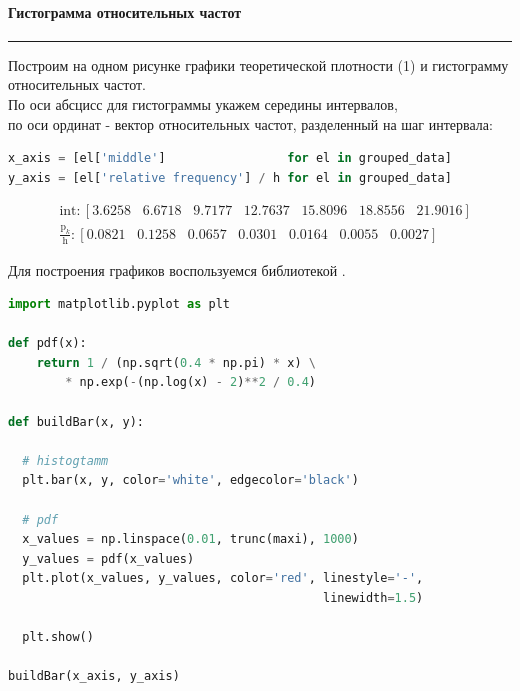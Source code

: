 \documentclass[a4paper, 14pt]{extarticle}
\begin{document}
\paragraph{Гистограмма относительных частот}\vspace{-20pt}\rule{\linewidth}{0.1mm}

Построим на одном рисунке графики теоретической плотности (1) и гистограмму относительных
частот. \\
По оси абсцисс для гистограммы укажем середины интервалов, \\
по оси ординат - вектор относительных частот, разделенный на шаг интервала: \\

\begin{lstlisting}[language=Python]
x_axis = [el['middle']                 for el in grouped_data]
y_axis = [el['relative frequency'] / h for el in grouped_data]
\end{lstlisting}

\begin{align*}
  & \text{int}: [ 3.6258 \hspace{10pt} 6.6718  \hspace{10pt} 9.7177 \hspace{10pt} 12.7637 \hspace{10pt} 15.8096 \hspace{10pt} 18.8556 \hspace{10pt} 21.9016] \\
  & \frac{\text{p}_k}{\text{h}}: [0.0821  \hspace{10pt} 0.1258  \hspace{10pt} 0.0657 \hspace{10pt} 0.0301  \hspace{10pt} 0.0164  \hspace{10pt} 0.0055  \hspace{10pt} 0.0027]
\end{align*}

Для построения графиков воспользуемся библиотекой . \\

\begin{lstlisting}[language=Python]
import matplotlib.pyplot as plt

def pdf(x):
    return 1 / (np.sqrt(0.4 * np.pi) * x) \
        * np.exp(-(np.log(x) - 2)**2 / 0.4)

def buildBar(x, y):

  # histogtamm 
  plt.bar(x, y, color='white', edgecolor='black')

  # pdf
  x_values = np.linspace(0.01, trunc(maxi), 1000)
  y_values = pdf(x_values)
  plt.plot(x_values, y_values, color='red', linestyle='-', 
                                            linewidth=1.5)

  plt.show()

buildBar(x_axis, y_axis)
\end{lstlisting}
\end{document}
